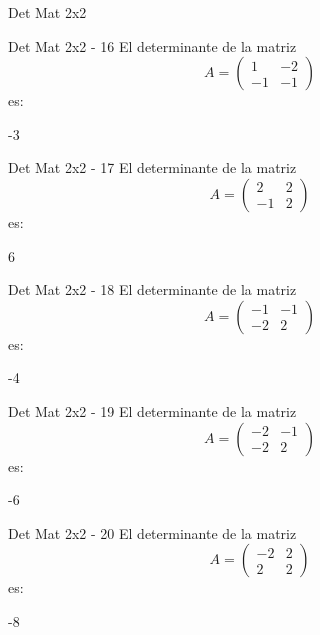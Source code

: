 \documentclass[a4,11pt]{aleph-notas}
\begin{document}
\begin{quiz}{Det Mat 2x2}
\begin{numerical}[tolerance=0]%
    {Det Mat 2x2 - 16}
    El determinante de la matriz
    \[
        A = \begin{pmatrix} 1 & -2 \\ -1 & -1 \end{pmatrix}
    \]
    es:
    \item[] -3
\end{numerical}

\begin{numerical}[tolerance=0]%
    {Det Mat 2x2 - 17}
    El determinante de la matriz
    \[
        A = \begin{pmatrix} 2 & 2 \\ -1 & 2 \end{pmatrix}
    \]
    es:
    \item[] 6
\end{numerical}

\begin{numerical}[tolerance=0]%
    {Det Mat 2x2 - 18}
    El determinante de la matriz
    \[
        A = \begin{pmatrix} -1 & -1 \\ -2 & 2 \end{pmatrix}
    \]
    es:
    \item[] -4
\end{numerical}

\begin{numerical}[tolerance=0]%
    {Det Mat 2x2 - 19}
    El determinante de la matriz
    \[
        A = \begin{pmatrix} -2 & -1 \\ -2 & 2 \end{pmatrix}
    \]
    es:
    \item[] -6
\end{numerical}

\begin{numerical}[tolerance=0]%
    {Det Mat 2x2 - 20}
    El determinante de la matriz
    \[
        A = \begin{pmatrix} -2 & 2 \\ 2 & 2 \end{pmatrix}
    \]
    es:
    \item[] -8
\end{numerical}


\end{quiz}
\end{document}
